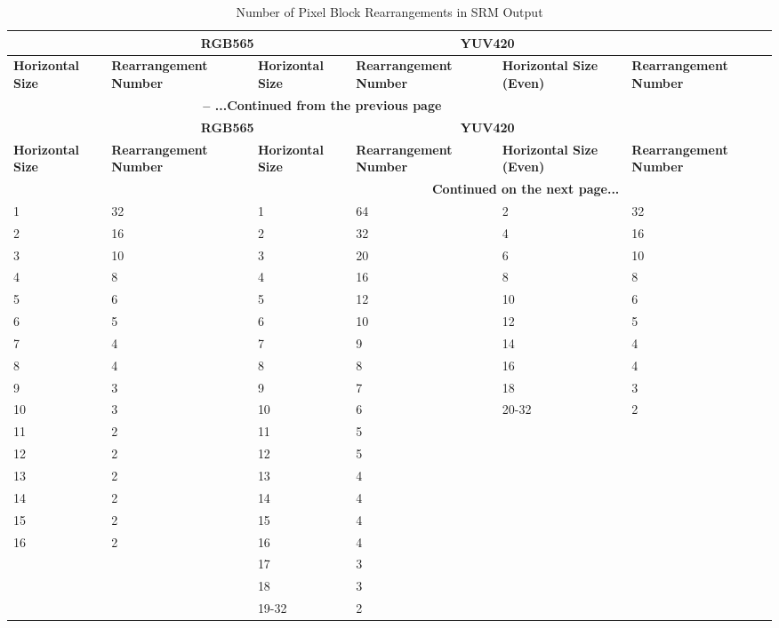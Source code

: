 \documentclass[main\_\_EN.tex]{subfiles}
\begin{document}
\begin{longtable}[c]{ |p{2cm}|p{2cm}|p{2cm}|p{2cm}|p{2cm}|p{2cm}| }
    \caption{Number of Pixel Block Rearrangements in SRM Output}
    \label{tab:srm_blk_ro_num}\\\hline

    \rowcolor{lightgray}
    \multicolumn{2}{|c|}{\textbf{ARGB8888/RGB888}} & \multicolumn{2}{c|}{\textbf{RGB565}} & \multicolumn{2}{c|}{\textbf{YUV420}} \\\hline
    \rowcolor{lightgray}
    \textbf{Horizontal Size} & \textbf{Rearrangement Number} & \textbf{Horizontal Size} & \textbf{Rearrangement Number} & \textbf{Horizontal Size (Even)} & \textbf{Rearrangement Number} \\\hline
    \endfirsthead


    \multicolumn{5}{c}{\bfseries \tablename\ \thetable{} -- ...Continued from the previous page}\\\hline
    \rowcolor{lightgray}
    \multicolumn{2}{|c|}{\textbf{ARGB8888/RGB888}} & \multicolumn{2}{c|}{\textbf{RGB565}} & \multicolumn{2}{c|}{\textbf{YUV420}} \\\hline
    \rowcolor{lightgray}
    \textbf{Horizontal Size} & \textbf{Rearrangement Number} & \textbf{Horizontal Size} & \textbf{Rearrangement Number} & \textbf{Horizontal Size (Even)} & \textbf{Rearrangement Number} \\\hline
    \endhead

    \multicolumn{5}{r}{\textbf{Continued on the next page...}} \\
    \endfoot

    \endlastfoot

        1  & 32 & 1  & 64 & 2  & 32 \\\hline
        2  & 16 & 2  & 32 & 4  & 16 \\\hline
        3  & 10 & 3  & 20 & 6  & 10 \\\hline
        4  & 8  & 4  & 16 & 8  & 8  \\\hline
        5  & 6  & 5  & 12 & 10 & 6  \\\hline
        6  & 5  & 6  & 10 & 12 & 5  \\\hline
        7  & 4  & 7  & 9  & 14 & 4  \\\hline
        8  & 4  & 8  & 8  & 16 & 4  \\\hline
        9  & 3  & 9  & 7  & 18 & 3  \\\hline
        10 & 3  & 10 & 6  & 20-32 & 2 \\\hline
        11 & 2  & 11 & 5  &  &  \\\hline
        12 & 2  & 12 & 5  &  &  \\\hline
        13 & 2  & 13 & 4  &  &  \\\hline
        14 & 2  & 14 & 4  &  &  \\\hline
        15 & 2  & 15 & 4  &  &  \\\hline
        16 & 2  & 16 & 4  &  &  \\\hline
           &    & 17 & 3  &  &  \\\hline
           &    & 18 & 3  &  &  \\\hline
           &    & 19-32 & 2 &  &  \\\hline


\end{longtable}
\end{document}
